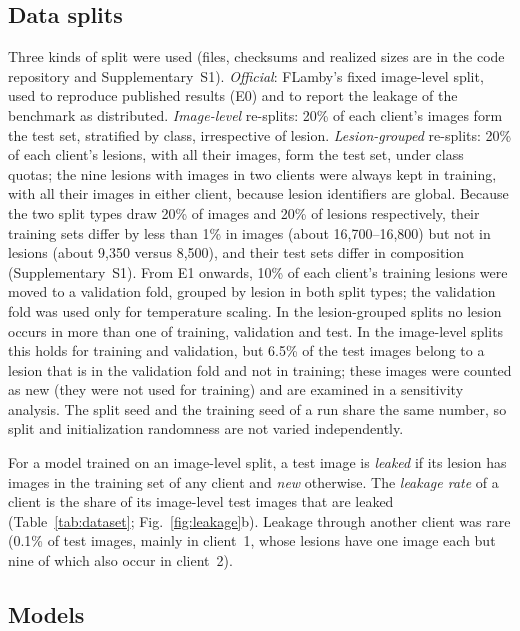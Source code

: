 \documentclass[VANCOUVER,Times1COL]{WileyNJDv5}
\begin{document}
\subsection{Data splits}
\label{sec:splits}

Three kinds of split were used (files, checksums and realized sizes are in the code repository and
Supplementary~S1).
\emph{Official}: FLamby's fixed image-level split, used to reproduce published results (E0) and to
report the leakage of the benchmark as distributed.
\emph{Image-level} re-splits: 20\% of each client's images form the test set, stratified by class,
irrespective of lesion.
\emph{Lesion-grouped} re-splits: 20\% of each client's lesions, with all their images, form the test set,
under class quotas; the nine lesions with images in two clients were always kept in training, with all their images in either client, because lesion identifiers are global. Because the
two split types draw 20\% of images and 20\% of lesions respectively, their training sets differ by less
than 1\% in images (about 16,700--16,800) but not in lesions (about 9,350 versus 8,500), and their test
sets differ in composition (Supplementary~S1). From E1 onwards, 10\% of each client's training lesions
were moved to a validation fold, grouped by lesion in both split types; the validation fold was used only
for temperature scaling. In the lesion-grouped splits no lesion occurs in more than one of training,
validation and test. In the image-level splits this holds for training and validation, but 6.5\% of the
test images belong to a lesion that is in the validation fold and not in training; these images were
counted as new (they were not used for training) and are examined in a sensitivity analysis. The split
seed and the training seed of a run share the same number, so split and initialization randomness are not
varied independently.

For a model trained on an image-level split, a test image is \emph{leaked} if its lesion has images in
the training set of any client and \emph{new} otherwise. The \emph{leakage rate} of a client is the
share of its image-level test images that are leaked (Table~\ref{tab:dataset}; Fig.~\ref{fig:leakage}b).
Leakage through another client was rare (0.1\% of test images, mainly in client~1, whose lesions have
one image each but nine of which also occur in client~2).

\subsection{Models}
\label{sec:models}
\end{document}

